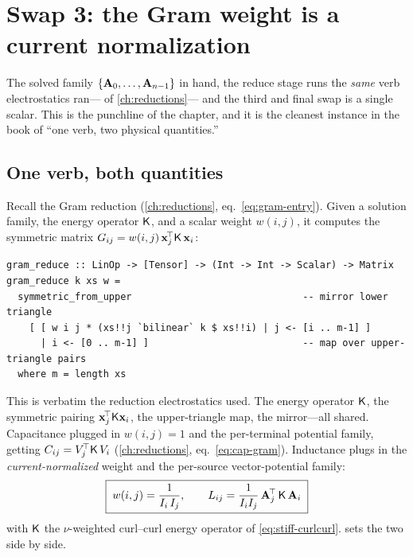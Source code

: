 \section{Swap 3: the Gram weight is a current normalization}
\label{sec:swap3}

The solved family $\{\mathbf{A}_0,\dots,\mathbf{A}_{n-1}\}$ in hand, the reduce stage runs the
\emph{same} verb electrostatics ran--- of \cref{ch:reductions}---
and the third and final swap is a single scalar. This is the punchline of the
chapter, and it is the cleanest instance in the book of ``one verb, two physical
quantities.''

\subsection{One verb, both quantities}

Recall the Gram reduction (\cref{ch:reductions}, eq.~\eqref{eq:gram-entry}). Given a
solution family, the energy operator $\mathsf{K}$, and a scalar weight $w(i,j)$, it
computes the symmetric matrix $G_{ij}=w(i,j)\,\mathbf{x}_j^{\!\top}\mathsf{K}\,\mathbf{x}_i$:
\begin{lstlisting}[style=l4style]
gram_reduce :: LinOp -> [Tensor] -> (Int -> Int -> Scalar) -> Matrix
gram_reduce k xs w =
  symmetric_from_upper                              -- mirror lower triangle
    [ [ w i j * (xs!!j `bilinear` k $ xs!!i) | j <- [i .. m-1] ]
      | i <- [0 .. m-1] ]                           -- map over upper-triangle pairs
  where m = length xs
\end{lstlisting}
This is verbatim the reduction electrostatics used. The energy operator $\mathsf{K}$,
the symmetric pairing $\mathbf{x}_j^{\!\top}\mathsf{K}\mathbf{x}_i$, the upper-triangle map, the
mirror---all shared. Capacitance plugged in $w(i,j)=1$ and the per-terminal
potential family, getting $C_{ij}=V_j^{\!\top}\mathsf{K}\,V_i$
(\cref{ch:reductions}, eq.~\eqref{eq:cap-gram}). Inductance plugs in the
\emph{current-normalized} weight and the per-source vector-potential family:
\begin{equation}
  \boxed{\;w(i,j) = \frac{1}{I_i\,I_j},
  \qquad
  L_{ij} = \frac{1}{I_i I_j}\,\mathbf{A}_j^{\!\top}\,\mathsf{K}\,\mathbf{A}_i\;}
  \label{eq:ind-gram-local}
\end{equation}
with $\mathsf{K}$ the $\nu$-weighted curl--curl energy operator of
\cref{eq:stiff-curlcurl}.  sets the two side by side.

